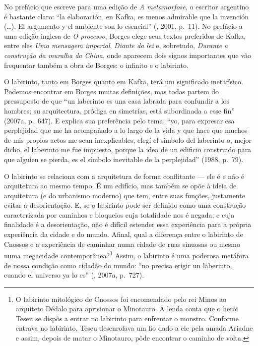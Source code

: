 No prefácio que escreve para uma edição de \emph{A metamorfose}, o
escritor argentino é bastante claro: ``la elaboración, en Kafka, es
menos admirable que la invención (\ldots{}). El argumento y el ambiente son
lo esencial'' (, 2001, p.~11). No prefácio a uma edição inglesa de
\emph{O processo}, Borges elege seus textos preferidos de Kafka, entre
eles \emph{Uma mensagem imperial}, \emph{Diante da lei} e, sobretudo,
\emph{Durante a construção da muralha da China}, onde aparecem dois
signos importantes que vão frequentar também a obra de Borges: o
infinito e o labirinto.

O labirinto, tanto em Borges quanto em Kafka, terá um significado
metafísico. Podemos encontrar em Borges muitas definições, mas todas
partem do pressuposto de que ``un laberinto es una casa labrada para
confundir a los hombres; su arquitectura, pródiga en simetrías, está
subordinada a esse fin'' (2007a, p.~647). E explica sua preferência pelo
tema: ``yo, para expresar esa perplejidad que me ha acompañado a lo
largo de la vida y que hace que muchos de mis propios actos me sean
inexplicables, elegí el símbolo del laberinto o, mejor dicho, el
laberinto me fue impuesto, porque la idea de un edificio construido para
que alguien se pierda, es el símbolo inevitable de la perplejidad''
(1988, p.~79).

O labirinto se relaciona com a arquitetura de forma conflitante --- ele é \label{labirinto}
e não é arquitetura ao mesmo tempo. É um edifício, mas também se opõe à
ideia de arquitetura (e do urbanismo moderno) que tem, entre suas
funções, justamente evitar a desorientação. E, se o labirinto pode ser
definido como uma construção caracterizada por caminhos e bloqueios cuja
totalidade nos é negada, e cuja finalidade é a desorientação, não é
difícil estender essa experiência para a própria experiência da cidade e
do mundo. Afinal, qual a diferença entre o labirinto de Cnossos e a
experiência de caminhar numa cidade de ruas sinuosas ou mesmo numa
megacidade contemporânea?\footnote{O labirinto mitológico de Cnossos foi
  encomendado pelo rei Minos ao arquiteto Dédalo para aprisionar o
  Minotauro. A lenda conta que o herói Teseu se dispôs a entrar no
  labirinto para enfrentar o monstro. Conforme entrava no labirinto,
  Teseu desenrolava um fio dado a ele pela amada Ariadne e assim, depois
  de matar o Minotauro, pôde encontrar o caminho de volta.} Assim, o
labirinto é uma poderosa metáfora de nossa condição como cidadão do
mundo: ``no precisa erigir un laberinto, cuando el universo ya lo es''
(, 2007a, p.~727).

